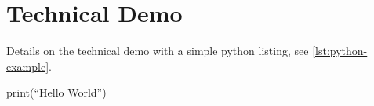 \section{Technical Demo}
Details on the technical demo with a simple python listing, see \cref{lst:python-example}.
\begin{python}[caption={Python Hello-World example},label={lst:python-example},aboveskip={\bigskipamount}]
  print(``Hello World'')
\end{python}